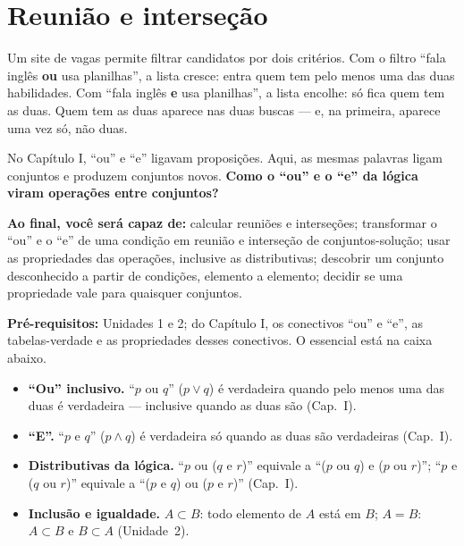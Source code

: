 \clearpage
\section{Reunião e interseção}

\Prefacio
\begin{prefacio}

Um site de vagas permite filtrar candidatos por dois critérios. Com o filtro \enquote{fala inglês \textbf{ou} usa planilhas}, a lista cresce: entra quem tem pelo menos uma das duas habilidades. Com \enquote{fala inglês \textbf{e} usa planilhas}, a lista encolhe: só fica quem tem as duas. Quem tem as duas aparece nas duas buscas — e, na primeira, aparece uma vez só, não duas.

No Capítulo I, \enquote{ou} e \enquote{e} ligavam proposições. Aqui, as mesmas palavras ligam conjuntos e produzem conjuntos novos. \textbf{Como o \enquote{ou} e o \enquote{e} da lógica viram operações entre conjuntos?}

\textbf{Ao final, você será capaz de:} calcular reuniões e interseções; transformar o \enquote{ou} e o \enquote{e} de uma condição em reunião e interseção de conjuntos-solução; usar as propriedades das operações, inclusive as distributivas; descobrir um conjunto desconhecido a partir de condições, elemento a elemento; decidir se uma propriedade vale para quaisquer conjuntos.

\textbf{Pré-requisitos:} Unidades 1 e 2; do Capítulo I, os conectivos \enquote{ou} e \enquote{e}, as tabelas-verdade e as propriedades desses conectivos. O essencial está na caixa abaixo.
\end{prefacio}

\begin{minimo}
\begin{itemize}[leftmargin=1.4em,itemsep=1pt]
  \item \textbf{\enquote{Ou} inclusivo.} \enquote{$p$ ou $q$} ($p\vee q$) é verdadeira quando pelo menos uma das duas é verdadeira — inclusive quando as duas são (Cap.~I).
  \item \textbf{\enquote{E}.} \enquote{$p$ e $q$} ($p\wedge q$) é verdadeira só quando as duas são verdadeiras (Cap.~I).
  \item \textbf{Distributivas da lógica.} \enquote{$p$ ou ($q$ e $r$)} equivale a \enquote{($p$ ou $q$) e ($p$ ou $r$)}; \enquote{$p$ e ($q$ ou $r$)} equivale a \enquote{($p$ e $q$) ou ($p$ e $r$)} (Cap.~I).
  \item \textbf{Inclusão e igualdade.} $A\subset B$: todo elemento de $A$ está em $B$; $A=B$: $A\subset B$ e $B\subset A$ (Unidade~2).
\end{itemize}
\end{minimo}

